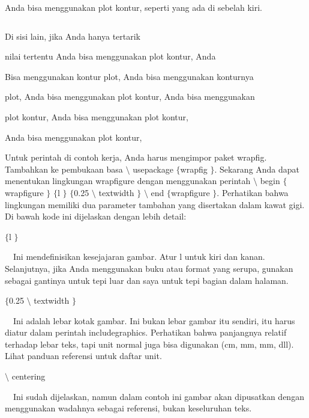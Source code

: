 \noindent 
Anda bisa menggunakan plot kontur, seperti yang ada di sebelah kiri. \par
\noindent 
 $  $ \par
\noindent 
Di sisi lain, jika Anda hanya tertarik \par
\noindent 
nilai tertentu Anda bisa menggunakan plot kontur, Anda \par
\noindent 
Bisa menggunakan kontur plot, Anda bisa menggunakan konturnya \par
\noindent 
plot, Anda bisa menggunakan plot kontur, Anda bisa menggunakan \par
\noindent 
plot kontur, Anda bisa menggunakan plot kontur, \par
\noindent 
Anda bisa menggunakan plot kontur, \par
\vspace{22pt}
\noindent 
Untuk perintah di contoh kerja, Anda harus mengimpor paket wrapfig. Tambahkan ke pembukaan basa  $  \setminus $ usepackage  $  \{  $wrapfig $  \}  $. Sekarang Anda dapat menentukan lingkungan wrapfigure dengan menggunakan perintah  $  \setminus $ begin  $  \{  $wrapfigure $  \}  $  $  \{  $l $  \}  $  $  \{  $0.25  $  \setminus $ textwidth $  \}  $  $  \setminus $ end  $  \{  $wrapfigure $  \}  $. Perhatikan bahwa lingkungan memiliki dua parameter tambahan yang disertakan dalam kawat gigi. Di bawah kode ini dijelaskan dengan lebih detail: \par
\vspace{12pt}
\noindent 
 $  \{  $l $  \}  $ \par
\noindent 
 $  $ $  $ $  $ $  $Ini mendefinisikan kesejajaran gambar. Atur l untuk kiri dan kanan. Selanjutnya, jika Anda menggunakan buku atau format yang serupa, gunakan sebagai gantinya untuk tepi luar dan saya untuk tepi bagian dalam halaman. \par
\vspace{12pt}
\noindent 
 $  \{  $0.25  $  \setminus $ textwidth $  \}  $ \par
\noindent 
 $  $ $  $ $  $ $  $Ini adalah lebar kotak gambar. Ini bukan lebar gambar itu sendiri, itu harus diatur dalam perintah includegraphics. Perhatikan bahwa panjangnya relatif terhadap lebar teks, tapi unit normal juga bisa digunakan (cm, mm, mm, dll). Lihat panduan referensi untuk daftar unit. \par
\vspace{12pt}
\noindent 
 $  \setminus $ centering \par
\noindent 
 $  $ $  $ $  $ $  $Ini sudah dijelaskan, namun dalam contoh ini gambar akan dipusatkan dengan menggunakan wadahnya sebagai referensi, bukan keseluruhan teks. \par
